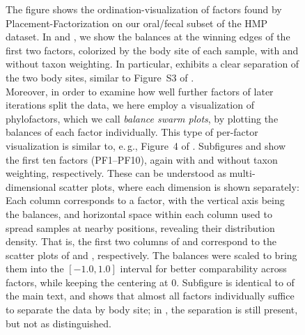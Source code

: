 \begin{figure}[!htb]
{        The figure shows the ordination-visualization of factors found by Placement-Factorization
        on our oral/fecal subset of the \ac{HMP} dataset.
        In 
        and ,
        we show the balances at the winning edges of the first two factors, colorized by the body site of each sample,
        with and without taxon weighting.
        In particular, 
        exhibits a clear separation of the two body sites, similar to Figure~S3 of \cite{Washburne2017a}.
        \\
        Moreover, in order to examine how well further factors of later iterations split the data,
        we here employ a visualization of phylofactors, which we call \emph{balance swarm plots},
        by plotting the balances of each factor individually.
        This type of per-factor visualization is similar to, e.\,g., Figure~4 of \cite{Washburne2019}.
        Subfigures  and
         show the first ten factors
        (PF1--PF10), again with and without taxon weighting, respectively.
        These can be understood as multi-dimensional scatter plots, where each dimension is shown separately:
        Each column corresponds to a factor, with the vertical axis being the balances,
        and horizontal space within each column used to spread samples at nearby positions,
        revealing their distribution density.
        That is, the first two columns of
         and
        correspond to the scatter plots of
        and , respectively.
        The balances were scaled to bring them into the $[ -1.0, 1.0 ]$ interval for better comparability across factors,
        while keeping the centering at \num{0}.
        Subfigure 
        is identical to  of the main text, and shows
        that almost all factors individually suffice to separate the data by body site;
        in ,
        the separation is still present, but not as distinguished.
    }
    \label{supp:fig:hmp_pf_of_600_factor_ordination}
\end{figure}

